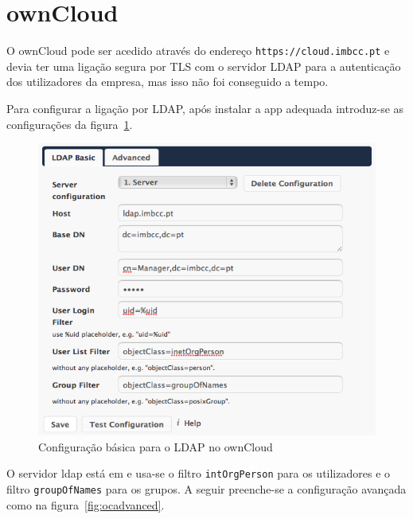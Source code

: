 \documentclass[12pt,a4paper]{report}
\begin{document}
\section{ownCloud}

O ownCloud pode ser acedido através do endereço \texttt{https://cloud.imbcc.pt} e devia ter uma ligação segura por TLS com o servidor LDAP para a autenticação dos utilizadores da empresa, mas isso não foi conseguido a tempo.

Para configurar a ligação por LDAP, após instalar a app adequada introduz-se as configurações da figura~\ref{fig:ocbasic}.

\begin{figure}[h]
\begin{center}
\includegraphics[width=\textwidth]{figs/oc-ldap.png}
\end{center}
\caption{Configuração básica para o LDAP no ownCloud}
\label{fig:ocbasic}
\end{figure}

O servidor ldap está em  e usa-se o filtro \texttt{intOrgPerson} para os utilizadores e o filtro \texttt{groupOfNames} para os grupos. A seguir preenche-se a configuração avançada como na figura~\ref{fig:ocadvanced}.
\end{document}
